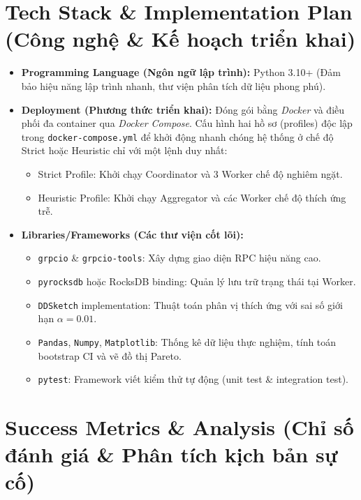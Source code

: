 \documentclass[12pt,a4paper]{article}
\begin{document}
\section{Tech Stack \& Implementation Plan (Công nghệ \& Kế hoạch triển khai)}
\begin{itemize}[leftmargin=*]
    \item \textbf{Programming Language (Ngôn ngữ lập trình):} Python 3.10+ (Đảm bảo hiệu năng lập trình nhanh, thư viện phân tích dữ liệu phong phú).
    \item \textbf{Deployment (Phương thức triển khai):}
    Đóng gói bằng \textit{Docker} và điều phối đa container qua \textit{Docker Compose}. Cấu hình hai hồ sơ (profiles) độc lập trong \texttt{docker-compose.yml} để khởi động nhanh chóng hệ thống ở chế độ Strict hoặc Heuristic chỉ với một lệnh duy nhất:
    \begin{itemize}[label={-}]
        \item Strict Profile: Khởi chạy Coordinator và 3 Worker chế độ nghiêm ngặt.
        \item Heuristic Profile: Khởi chạy Aggregator và các Worker chế độ thích ứng trễ.
    \end{itemize}
    \item \textbf{Libraries/Frameworks (Các thư viện cốt lõi):}
    \begin{itemize}[label={-}]
        \item \texttt{grpcio} \& \texttt{grpcio-tools}: Xây dựng giao diện RPC hiệu năng cao.
        \item \texttt{pyrocksdb} hoặc RocksDB binding: Quản lý lưu trữ trạng thái tại Worker.
        \item \texttt{DDSketch} implementation: Thuật toán phân vị thích ứng với sai số giới hạn $\alpha = 0.01$.
        \item \texttt{Pandas}, \texttt{Numpy}, \texttt{Matplotlib}: Thống kê dữ liệu thực nghiệm, tính toán bootstrap CI và vẽ đồ thị Pareto.
        \item \texttt{pytest}: Framework viết kiểm thử tự động (unit test \& integration test).
    \end{itemize}
\end{itemize}

\vspace{0.5cm}

\section{Success Metrics \& Analysis (Chỉ số đánh giá \& Phân tích kịch bản sự cố)}
\end{document}

